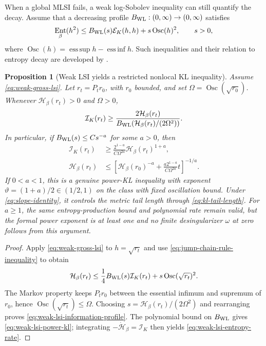 \documentclass[11pt]{article}
\newtheorem{proposition}[theorem]{Proposition}
\theoremstyle{definition}
\DeclareMathOperator{\Ent}{Ent}
\newcommand{\cE}{\mathcal E}
\newcommand{\cI}{\mathcal I}
\newcommand{\cH}{\mathcal H}
\begin{document}
When a global MLSI fails, a weak log-Sobolev inequality can still quantify
the decay.  Assume that a decreasing profile $B_{\rm WL}:(0,\infty)\to
(0,\infty)$ satisfies
\begin{equation}\label{eq:weak-gross-lsi}
  \Ent_\beta(h^2)
  \leq B_{\rm WL}(s)\cE_K(h,h)
       +s\operatorname{Osc}(h)^2,
  \qquad s>0,
\end{equation}
where $\operatorname{Osc}(h)=\operatorname*{ess\,sup}h-
\operatorname*{ess\,inf}h$.  Such inequalities and their relation to entropy
decay are developed by \citet{CattiauxGentilGuillin2007}.

\begin{proposition}[Weak LSI yields a restricted nonlocal KL inequality]
\label{prop:weak-lsi-kl-profile}
Assume \eqref{eq:weak-gross-lsi}.  Let $r_t=P_t r_0$, with $r_0$ bounded, and
set $\Omega=\operatorname{Osc}(\sqrt{r_0})$.  Whenever
$\cH_\beta(r_t)>0$ and $\Omega>0$,
\begin{equation}\label{eq:weak-lsi-information-profile}
  \cI_K(r_t)
  \geq
  \frac{2\cH_\beta(r_t)}
       {B_{\rm WL}\!\left(\cH_\beta(r_t)/(2\Omega^2)\right)}.
\end{equation}
In particular, if $B_{\rm WL}(s)\leq Cs^{-a}$ for some $a>0$, then
\begin{align}
  \cI_K(r_t)
  &\geq \frac{2^{1-a}}{C\Omega^{2a}}
      \cH_\beta(r_t)^{1+a},
  \label{eq:weak-lsi-power-kl}\\
  \cH_\beta(r_t)
  &\leq
  \left[
    \cH_\beta(r_0)^{-a}
    +\frac{a2^{1-a}}{C\Omega^{2a}}t
  \right]^{-1/a}.
  \label{eq:weak-lsi-entropy-rate}
\end{align}
If $0<a<1$, this is a genuine power-KL inequality with exponent
$\vartheta=(1+a)/2\in(1/2,1)$ on the class with fixed oscillation bound.
Under \eqref{eq:slope-identity}, it controls the metric tail length through
\eqref{eq:kl-tail-length}.  For $a\geq1$, the same entropy-production bound
and polynomial rate remain valid, but the formal power exponent is at least
one and no finite desingularizer $\omega$ at zero follows from this argument.
\end{proposition}

\begin{proof}
Apply \eqref{eq:weak-gross-lsi} to $h=\sqrt{r_t}$ and use
\eqref{eq:jump-chain-rule-inequality} to obtain
\[
  \cH_\beta(r_t)
  \leq \frac14B_{\rm WL}(s)\cI_K(r_t)
      +s\operatorname{Osc}(\sqrt{r_t})^2.
\]
The Markov property keeps $P_t r_0$ between the essential infimum and
supremum of $r_0$, hence
$\operatorname{Osc}(\sqrt{r_t})\leq\Omega$.  Choosing
$s=\cH_\beta(r_t)/(2\Omega^2)$ and rearranging proves
\eqref{eq:weak-lsi-information-profile}.  The polynomial bound on
$B_{\rm WL}$ gives \eqref{eq:weak-lsi-power-kl}; integrating
$-\dot{\cH}_\beta=\cI_K$ then yields
\eqref{eq:weak-lsi-entropy-rate}.
\end{proof}
\end{document}
